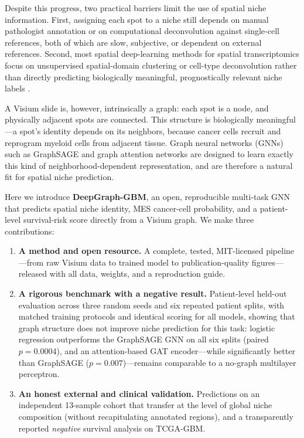 \documentclass[11pt,letterpaper]{article}
\begin{document}
Despite this progress, two practical barriers limit the use of spatial niche information. First, assigning each spot to a niche still depends on manual pathologist annotation or on computational deconvolution against single-cell references, both of which are slow, subjective, or dependent on external references. Second, most spatial deep-learning methods for spatial transcriptomics focus on unsupervised spatial-domain clustering or cell-type deconvolution rather than directly predicting biologically meaningful, prognostically relevant niche labels \cite{xu2023spacel,peng2023,liu2023review}.

A Visium slide is, however, intrinsically a graph: each spot is a node, and physically adjacent spots are connected. This structure is biologically meaningful---a spot's identity depends on its neighbors, because cancer cells recruit and reprogram myeloid cells from adjacent tissue. Graph neural networks (GNNs) such as GraphSAGE \cite{hamilton2017} and graph attention networks \cite{velickovic2018} are designed to learn exactly this kind of neighborhood-dependent representation, and are therefore a natural fit for spatial niche prediction.

Here we introduce \textbf{DeepGraph-GBM}, an open, reproducible multi-task GNN that predicts spatial niche identity, MES cancer-cell probability, and a patient-level survival-risk score directly from a Visium graph. We make three contributions:
\begin{enumerate}
  \item \textbf{A method and open resource.} A complete, tested, MIT-licensed pipeline---from raw Visium data to trained model to publication-quality figures---released with all data, weights, and a reproduction guide.
  \item \textbf{A rigorous benchmark with a negative result.} Patient-level held-out evaluation across three random seeds and six repeated patient splits, with matched training protocols and identical scoring for all models, showing that graph structure does not improve niche prediction for this task: logistic regression outperforms the GraphSAGE GNN on all six splits (paired $p=0.0004$), and an attention-based GAT encoder---while significantly better than GraphSAGE ($p=0.007$)---remains comparable to a no-graph multilayer perceptron.
  \item \textbf{An honest external and clinical validation.} Predictions on an independent 13-sample cohort that transfer at the level of global niche composition (without recapitulating annotated regions), and a transparently reported \emph{negative} survival analysis on TCGA-GBM.
\end{enumerate}
\end{document}
